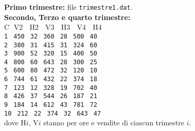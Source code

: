 \documentclass[11pt]{article}
\begin{document}
\begin{mdframed}[backgroundcolor=panna]
{\bf Primo trimestre:} file \texttt{trimestre1.dat}.
\\
{\bf Secondo, Terzo e quarto trimestre:}
\\
 C $\;$V2  $\;$ H2 $\;$ V3 $\;$ H3 $\;$   V4 $\;$ H4\\
\texttt{1$\;$          450$\;$             32$\;$       360$\;$         28$\;$            500$\;$        40 \\
           2$\;$         380$\;$             31$\;$        415$\;$         31$\;$            324$\;$        60 \\
           3$\;$          900$\;$             52$\;$        320$\;$         15$\;$            400$\;$        50\\
           4$\;$          800$\;$             60$\;$        643$\;$         28$\;$            300$\;$        25\\
           5$\;$         600$\;$             80$\;$        472$\;$         32$\;$            120$\;$        10\\
           6$\;$         744$\;$             61$\;$        432$\;$         22$\;$            374$\;$        18\\ 
           7$\;$        123$\;$             12$\;$        328$\;$         19$\;$            702$\;$        40\\ 
           8$\;$        426$\;$             37$\;$        544$\;$         26$\;$            187$\;$        21\\
           9$\;$        184$\;$             14$\;$        612$\;$         43$\;$            781$\;$        72\\
           10$\;$      212$\;$         22$\;$        374$\;$         32$\;$            643$\;$        47\\}
dove H$i$, V$i$ stanno per ore e vendite di ciascun trimestre $i$.
\end{mdframed}
 
\end{document}
